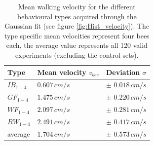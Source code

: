 \begin{center}
\vspace{-2mm}
\begin{table}[H]
\caption{Mean walking velocity for the different behavioural types acquired through the Gaussian fit (see figure \ref{fig:Hist_velocity}). The type specific mean velocities represent four bees each, the average value represents all 120 valid experiments (excluding the control sets).}
    \centering
    \begin{tabular}{p{1.2cm}|p{3.0cm}|p{4.0cm}}
         \textbf{Type} & \textbf{Mean velocity $v_{bee}$} & \textbf{Deviation $\sigma$} \\
         \hline
         \hline
         $IB_{1-4}$ & $0.607 \,cm/s$ & $\pm$ $0.018 \,cm/s$  \\
         $GF_{1-4}$ & $1.475 \,cm/s$ & $\pm$ $0.220 \,cm/s$  \\
         $WF_{1-4}$ & $2.097 \,cm/s$ & $\pm$ $0.281 \,cm/s$  \\
         $RW_{1-4}$ & $2.491 \,cm/s$ & $\pm$ $0.417 \,cm/s$  \\
         average & $1.704 \,cm/s$ & $\pm$ $0.573 \,cm/s$  \\
    \end{tabular}
    \label{tab:vel_gauss}
    \vspace{-10mm}
\end{table}
\end{center}


